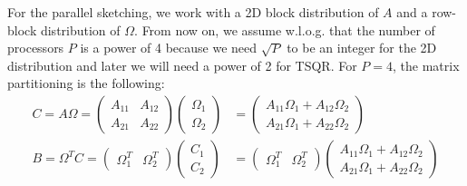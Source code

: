 \documentclass{article}
\theoremstyle{definition}
\begin{document}
For the parallel sketching, we work with a 2D block distribution of $A$ and a row-block distribution of $\Omega$. From now on, we assume w.l.o.g. that the number of processors $P$ is a power of 4 because we need $\sqrt{P}$ to be an integer for the 2D distribution and later we will need a power of 2 for TSQR. For $P=4$, the matrix partitioning is the following:
\begin{align*}
    C = A \Omega 
    = \begin{pmatrix}
        A_{11} & A_{12} \\
        A_{21} & A_{22}
    \end{pmatrix}
    \begin{pmatrix}
        \Omega_1 \\
        \Omega_2
    \end{pmatrix}
    &= \begin{pmatrix}
        A_{11} \Omega_1 + A_{12} \Omega_2 \\
        A_{21} \Omega_1 + A_{22} \Omega_2
    \end{pmatrix}
    \\
    B = \Omega^T C
    = \begin{pmatrix}
        \Omega_1^T & \Omega_2^T
    \end{pmatrix}
    \begin{pmatrix}
        C_1 \\
        C_2
    \end{pmatrix}
    &= \begin{pmatrix}
        \Omega_1^T & \Omega_2^T
    \end{pmatrix}
    \begin{pmatrix}
        A_{11} \Omega_1 + A_{12} \Omega_2 \\
        A_{21} \Omega_1 + A_{22} \Omega_2
    \end{pmatrix}
\end{align*}
\end{document}
